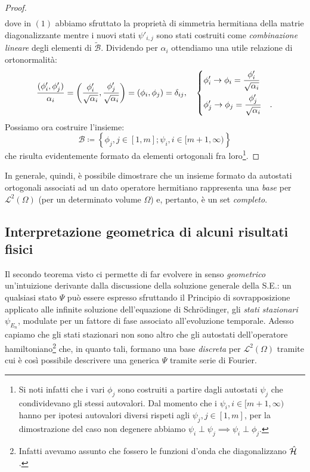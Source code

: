 \begin{proof}
\[\begin{aligned}
        \end{aligned}
    \]
    dove in $(1)$ abbiamo sfruttato la proprietà di simmetria hermitiana della matrie diagonalizzante mentre i nuovi stati $\psi'_{i,j}$ sono stati costruiti come \emph{combinazione lineare} degli elementi di $\tilde{\mathcal{B}}$. Dividendo per $\alpha_i$ ottendiamo una utile relazione di ortonormalità:
    \[
       \frac{(\phi'_i, \phi'_j)}{\alpha_i} = \left( \frac{\phi'_i}{\sqrt{\alpha_i}}, \frac{\phi'_j}{\sqrt{\alpha_i}} \right) = (\phi_i, \phi_j) = \delta_{ij}, \quad
       \begin{dcases}
            \phi'_i \to \phi_i = \frac{\phi'_i}{\sqrt{\alpha_i}} \\
            \phi'_j \to \phi_j = \frac{\phi'_j}{\sqrt{\alpha_i}} \quad.
       \end{dcases}
    \]
    Possiamo ora costruire l'insieme:
    \[
        \mathcal{B} \coloneq \left\{ \phi_j, j \in [1, m]; \psi_i, i \in [m+1, \infty) \right\}
    \]
    che risulta evidentemente formato da elementi ortogonali fra loro\footnote{Si noti infatti che i vari $\phi_j$ sono costruiti a partire dagli autostati $\psi_j$ che condividevano gli stessi autovalori. Dal momento che i $\psi_i, i \in [m+1, \infty)$ hanno per ipotesi autovalori diversi rispeti agli $\psi_j, j \in [1, m]$, per la dimostrazione del caso non degenere abbiamo $\psi_i \perp \psi_j \implies \psi_i \perp \phi_j$.}.
\end{proof}

In generale, quindi, è possibile dimostrare che un insieme formato da autostati ortogonali associati ad un dato operatore hermitiano rappresenta una \emph{base} per $\mathcal{L}^2(\Omega)$ (per un determinato volume $\Omega$) e, pertanto, è un set \emph{completo}. 

\subsection{Interpretazione geometrica di alcuni risultati fisici}
Il secondo teorema visto ci permette di far evolvere in senso \emph{geometrico} un'intuizione derivante dalla discussione della soluzione generale della S.E.: un qualsiasi stato $\Psi$ può essere espresso sfruttando il Principio di sovrapposizione applicato alle infinite soluzione dell'equazione di Schrödinger, gli \emph{stati stazionari} $\psi_{E_n}$, modulate per un fattore di fase associato all'evoluzione temporale. Adesso capiamo che gli stati stazionari non sono altro che gli autostati dell'operatore hamiltoniano\footnote{Infatti avevamo assunto che fossero le funzioni d'onda che diagonalizzano $\hat{\mathcal{H}}$.} che, in quanto tali, formano una base \emph{discreta} per $\mathcal{L}^2(\Omega)$ tramite cui è così possibile descrivere una generica $\Psi$ tramite serie di Fourier. 

